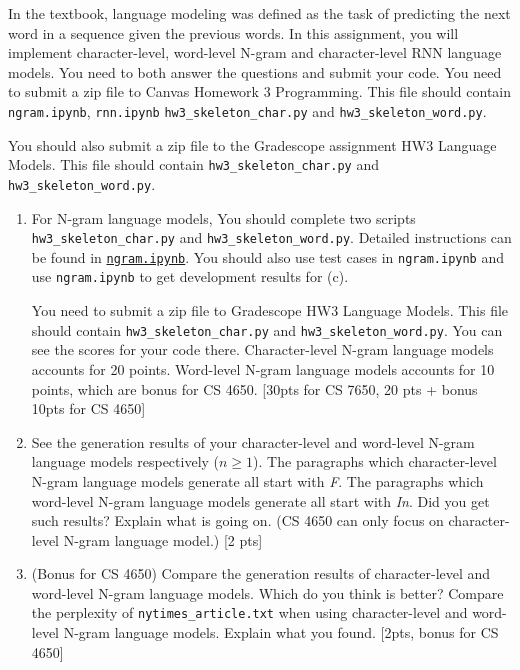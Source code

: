  In the textbook, language modeling was defined as the task of predicting the next word in a sequence given the previous words. In this assignment, you will implement character-level, word-level N-gram  and character-level RNN language models. You need to both answer the questions and submit your code. You need to submit a zip file to Canvas Homework 3 Programming. This file should contain \texttt{ngram.ipynb}, \texttt{rnn.ipynb} \texttt{hw3\_skeleton\_char.py} and \texttt{hw3\_skeleton\_word.py}. 
 
 You should also submit a zip file to the Gradescope assignment HW3 Language Models. 
 This file should contain \texttt{hw3\_skeleton\_char.py} and \texttt{hw3\_skeleton\_word.py}.

\begin{enumerate}
    \item For N-gram language models, You should complete two scripts \texttt{hw3\_skeleton\_char.py} and \texttt{hw3\_skeleton\_word.py}. Detailed instructions can be found in  \href{https://www.cc.gatech.edu/classes/AY2020/cs7650_spring/hw3/lm/ngram.zip} {\texttt{ngram.ipynb}}. You should also use test cases in \texttt{ngram.ipynb} and use \texttt{ngram.ipynb} to get development results for (c). 
    
    You need to submit a zip file to Gradescope HW3 Language Models. This file should contain \texttt{hw3\_skeleton\_char.py} and \texttt{hw3\_skeleton\_word.py}. You can see the scores for your code there. Character-level N-gram language models accounts for 20 points. Word-level N-gram language models accounts for 10 points, which are bonus for CS 4650. [30pts for CS 7650, 20 pts + bonus 10pts for CS 4650] 

     
    \item See the generation results of your character-level and word-level N-gram language models respectively ($n\geq 1$). The paragraphs which character-level N-gram language models generate all start with \textit{F}. The paragraphs which word-level N-gram language models generate all start with \textit{In}. Did you get such results? Explain what is going on. (CS 4650 can only focus on character-level N-gram language model.) [2 pts]
    
    
    \item (Bonus for CS 4650) Compare the generation results of character-level and word-level N-gram language models. Which do you think is better?  Compare the perplexity of \texttt{nytimes\_article.txt} when using character-level and word-level N-gram language models. Explain what you found. [2pts, bonus for CS 4650]
    

\end{enumerate}
